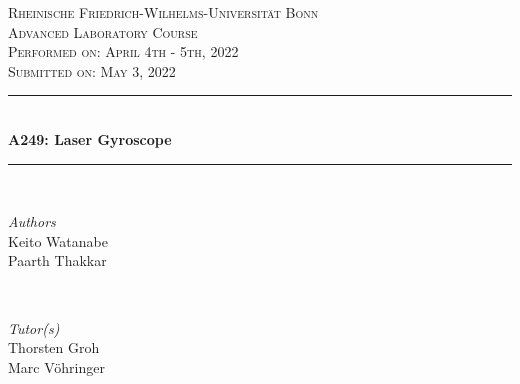 \documentclass[a4paper]{report}
\numberwithin{equation}{section}
\begin{document}
\begin{titlepage} %
	\newcommand{\HRule}{\rule{\linewidth}{0.5mm}} %
	
	\center %
	
	\textsc{\LARGE Rheinische Friedrich-Wilhelms-Universit\"at Bonn }\\[4cm] %
	
	\textsc{\Large Advanced Laboratory Course}\\[0.5cm] %
	
	\textsc{\large Performed on: April 4th - 5th, 2022}\\[0.5cm] %

	\textsc{\large Submitted on: May 3, 2022}\\[0.5cm] %
	
	
	\HRule\\[0.4cm]
	
	{\huge\bfseries A249: Laser Gyroscope}\\[0.4cm] %
	
	\HRule\\[1.5cm]
	
	
	\begin{minipage}{0.4\textwidth}
		\begin{flushleft}
			\large
			\textit{Authors}\\
			Keito Watanabe \\
			Paarth Thakkar
		\end{flushleft}
	\end{minipage}
	~
	\begin{minipage}{0.4\textwidth}
		\begin{flushright}
			\large
			\textit{Tutor(s)}\\
			Thorsten Groh \\
			Marc Vöhringer
		\end{flushright}
	\end{minipage}


\end{titlepage}
\end{document}
